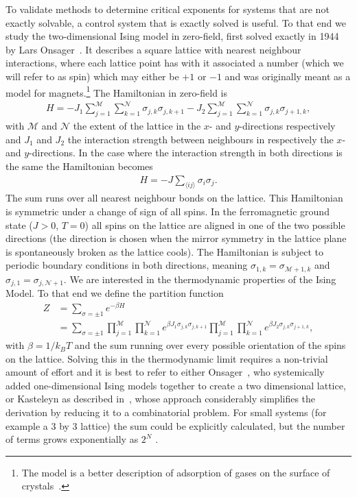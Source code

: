 \documentclass[11pt, a4paper]{report} %
\begin{document}
To validate methods to determine critical exponents for systems that are not exactly solvable, a control system that is exactly solved is useful. To that end we study the two-dimensional Ising model in zero-field, first solved exactly in 1944 by Lars Onsager~\cite{onsager:1944}.
It describes a square lattice with nearest neighbour interactions, where each lattice point has with it associated a number (which we will refer to as spin) which may either be \(+1\) or \(-1\) and was originally meant as a model for magnets.\footnote{The model is a better description of adsorption of gases on the surface of crystals~\cite{onsager:1944}.}
The Hamiltonian in zero-field is~\cite{mccoy:1973}
\begin{align}
	H = -J_{1} \sum_{j=1}^{\mathcal{M}} \sum_{k=1}^{\mathcal{N}} \sigma_{j,k} \sigma_{j,k+1} - J_{2} \sum_{j=1}^{\mathcal{M}} \sum_{k=1}^{\mathcal{N}} \sigma_{j,k} \sigma_{j+1,k},
\end{align}
with \(\mathcal{M}\) and \(\mathcal{N}\) the extent of the lattice in the \(x\)- and \(y\)-directions respectively and \(J_{1}\) and \(J_{2}\) the interaction strength between neighbours in respectively the \(x\)- and \(y\)-directions.
In the case where the interaction strength in both directions is the same the Hamiltonian becomes~\cite{newman:1999}
\begin{align}
	\label{eq:isotropic_Hamiltonian}
	H = -J \sum_{\langle ij \rangle} \sigma_{i} \sigma_{j}.
\end{align}
The sum runs over all nearest neighbour bonds on the lattice.
This Hamiltonian is symmetric under a change of sign of all spins.
In the ferromagnetic ground state (\(J>0\), \(T=0\)) all spins on the lattice are aligned in one of the two possible directions (the direction is chosen when the mirror symmetry in the lattice plane is spontaneously broken as the lattice cools).
The Hamiltonian is subject to periodic boundary conditions in both directions, meaning \(\sigma_{1,k} = \sigma_{\mathcal{M}+1,k}\) and \(\sigma_{j,1} = \sigma_{j,\mathcal{N}+1}\).
We are interested in the thermodynamic properties of the Ising Model.
To that end we define the partition function
\begin{align}
	Z &= \sum_{\sigma = \pm 1} e^{-\beta H} \\
	  &= \sum_{\sigma = \pm 1} \prod_{j=1}^{\mathcal{M}} \prod_{k=1}^{\mathcal{N}} e^{\beta J_1 \sigma_{j,k} \sigma_{j,k+1}} \prod_{j=1}^{\mathcal{M}} \prod_{k=1}^{\mathcal{N}} e^{\beta J_2 \sigma_{j,k} \sigma_{j+1,k}},
\end{align}
with \(\beta=1/k_B T\) and the sum running over every possible orientation of the spins on the lattice. Solving this in the thermodynamic limit requires a non-trivial amount of effort and it is best to refer to either Onsager~\cite{onsager:1944}, who systemically added one-dimensional Ising models together to create a two dimensional lattice, or Kasteleyn as described in~\cite{mccoy:1973}, whose approach considerably simplifies the derivation by reducing it to a combinatorial problem.
For small systems (for example a 3 by 3 lattice) the sum could be explicitly calculated, but the number of terms grows exponentially as \(2^N\) \cite{newman:1999,binney:1992}.
\end{document}
